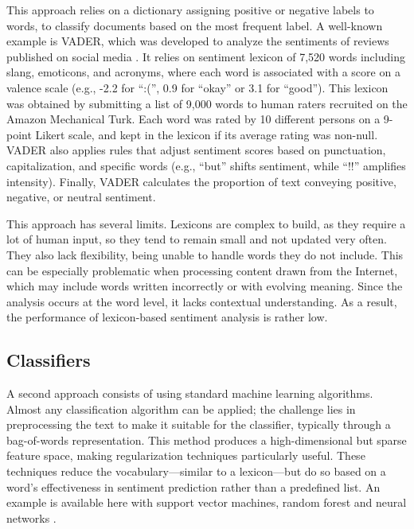 \documentclass{article}
\begin{document}
This approach relies on a dictionary assigning positive or negative labels to words, to classify documents based on the most frequent label. A well-known example is VADER, which was developed to analyze the sentiments of reviews published on social media \citep{hutto_vader_2014}. It relies on sentiment lexicon of 7,520 words including slang, emoticons, and acronyms, where each word is associated with a score on a valence scale (e.g., -2.2 for \enquote{:(}, 0.9 for \enquote{okay} or 3.1 for \enquote{good}). This lexicon was obtained by submitting a list of 9,000 words to human raters recruited on the Amazon Mechanical Turk. Each word was rated by 10 different persons on a 9-point Likert scale, and kept in the lexicon if its average rating was non-null. VADER also applies rules that adjust sentiment scores based on punctuation, capitalization, and specific words (e.g., \enquote{but} shifts sentiment, while \enquote{!!} amplifies intensity). Finally, VADER calculates the proportion of text conveying positive, negative, or neutral sentiment.

This approach has several limits. Lexicons are complex to build, as they require a lot of human input, so they tend to remain small and not updated very often. They also lack flexibility, being unable to handle words they do not include. This can be especially problematic when processing content drawn from the Internet, which may include words written incorrectly or with evolving meaning. Since the analysis occurs at the word level, it lacks contextual understanding. As a result, the performance of lexicon-based sentiment analysis is rather low.

\subsection{Classifiers}

A second approach consists of using standard machine learning algorithms. Almost any classification algorithm can be applied; the challenge lies in preprocessing the text to make it suitable for the classifier, typically through a bag-of-words representation. This method produces a high-dimensional but sparse feature space, making regularization techniques particularly useful. These techniques reduce the vocabulary—similar to a lexicon—but do so based on a word’s effectiveness in sentiment prediction rather than a predefined list. An example is available here with support vector machines, random forest and neural networks \citep{wang_is_2024}.
\end{document}
